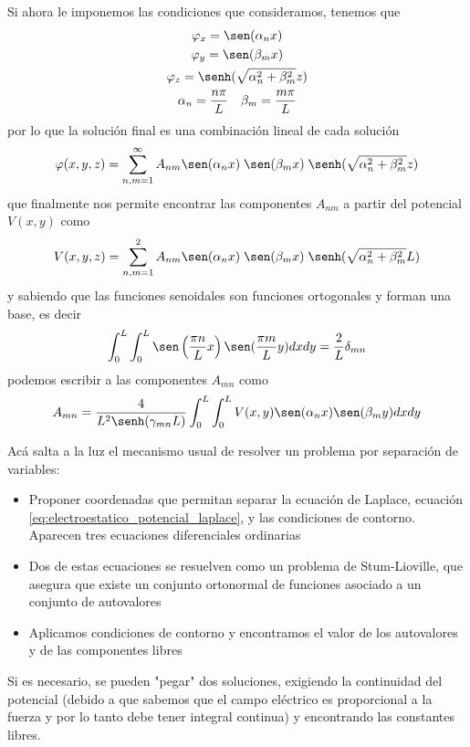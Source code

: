 \documentclass[a4paper]{article}
\numberwithin{equation}{section} %
\begin{document}
Si ahora le imponemos las condiciones que consideramos, tenemos que
\begin{equation}
  \begin{gathered}
    \varphi_{x} = \sen(\alpha_n x)\\
    \varphi_y = \sen(\beta_m x)\\
    \varphi_z = \senh(\sqrt{\alpha_n^2 + \beta_m^2} z)\\
    \alpha_n = \frac{n \pi}{L} \quad \beta_m = \frac{m \pi}{L}
  \end{gathered}
\end{equation}
por lo que la solución final es una combinación lineal de cada solución
\begin{equation}
  \varphi(x, y, z) = \sum^\infty_{n, m = 1} A_{nm} \sen(\alpha_n x)\; \sen(\beta_m x)\; \senh(\sqrt{\alpha_n^2 + \beta_m^2} z)
\end{equation}
que finalmente nos permite encontrar las componentes $A_{nm}$ a partir del potencial $V(x,y)$ como
\begin{equation}
  V(x, y, z) = \sum^2_{n, m = 1} A_{nm} \sen(\alpha_n x)\; \sen(\beta_m x)\; \senh(\sqrt{\alpha_n^2 + \beta_m^2} L)
\end{equation}
y sabiendo que las funciones senoidales son funciones ortogonales y forman una base, es decir
\begin{equation}
  \int_{0}^{L} \int_{0}^{L} \sen\left(\frac{\pi n}{L} x\right) \sen(\frac{\pi m}{L} y) dx dy = \frac{2}{L} \delta_{mn}
\end{equation}
podemos escribir a las componentes $A_{mn}$ como
\begin{equation}
  A_{mn} = \frac{4}{L^2 \senh(\gamma_{mn} L)}\int_{0}^{L} \int_{0}^{L} V(x, y) \sen(\alpha_n x) \sen(\beta_m y) dx dy
\end{equation}

Acá salta a la luz el mecanismo usual de resolver un problema por separación de variables:
\begin{itemize}
  \item{Proponer coordenadas que permitan separar la ecuación de Laplace, ecuación \ref{eq:electroestatico_potencial_laplace}, y las condiciones de contorno. Aparecen tres ecuaciones diferenciales ordinarias}
  \item{Dos de estas ecuaciones se resuelven como un problema de Stum-Lioville, que asegura que existe un conjunto ortonormal de funciones asociado a un conjunto de autovalores}
  \item{Aplicamos condiciones de contorno y encontramos el valor de los autovalores y de las componentes libres}
\end{itemize}
Si es necesario, se pueden "pegar" dos soluciones, exigiendo la continuidad del potencial (debido a que sabemos que el campo eléctrico es proporcional a la fuerza y por lo tanto debe tener integral continua) y encontrando las constantes libres.
\end{document}
